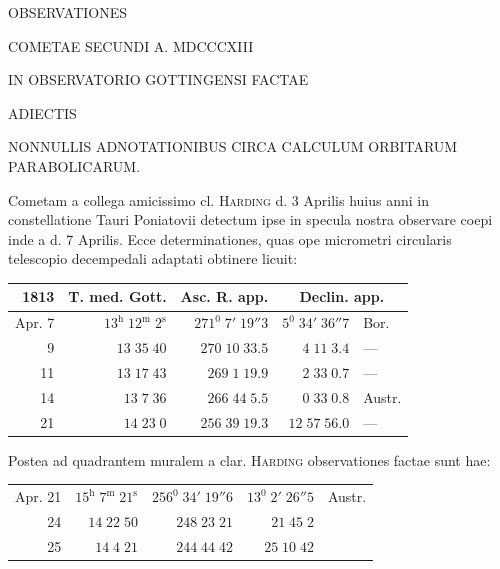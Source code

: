 \renewcommand{\Article}[1]{\par\medskip\Needspace{4\baselineskip}\pdfbookmark[1]{Art. #1}{cometae-art-#1}\centerline{\textbf{#1.}}\nobreak\smallskip}
\begin{center}
{\large OBSERVATIONES}\par\medskip
{\Large COMETAE SECUNDI A. MDCCCXIII}\par\medskip
IN OBSERVATORIO GOTTINGENSI FACTAE\par\medskip
ADIECTIS\par\medskip
NONNULLIS ADNOTATIONIBUS CIRCA CALCULUM ORBITARUM PARABOLICARUM.
\end{center}

Cometam a collega amicissimo cl. \textsc{Harding} d. 3 Aprilis huius anni in constellatione Tauri Poniatovii detectum ipse in specula nostra observare coepi inde a d. 7 Aprilis. Ecce determinationes, quas ope micrometri circularis telescopio decempedali adaptati obtinere licuit:
\begin{center}\small\setlength{\tabcolsep}{4pt}
\begin{tabular}{r|r|r|r l}
1813&T. med. Gott.&Asc. R. app.&\multicolumn{2}{c}{Declin. app.}\\\hline
Apr. 7&$13^{\mathrm h}\;12^{\mathrm m}\;2^{\mathrm s}$&$271^0\;7'\;19''3$&$5^0\;34'\;36''7$&Bor.\\
9&$13\;35\;40$&$270\;10\;33.5$&$4\;11\;3.4$&—\\
11&$13\;17\;43$&$269\;1\;19.9$&$2\;33\;0.7$&—\\
14&$13\;7\;36$&$266\;44\;5.5$&$0\;33\;0.8$&Austr.\\
21&$14\;23\;0$&$256\;39\;19.3$&$12\;57\;56.0$&—
\end{tabular}\end{center}

Postea ad quadrantem muralem a clar. \textsc{Harding} observationes factae sunt hae:
\begin{center}\small\setlength{\tabcolsep}{4pt}
\begin{tabular}{r|r|r|r l}
Apr. 21&$15^{\mathrm h}\;7^{\mathrm m}\;21^{\mathrm s}$&$256^0\;34'\;19''6$&$13^0\;2'\;26''5$&Austr.\\
24&$14\;22\;50$&$248\;23\;21$&$21\;45\;2$&\\
25&$14\;4\;21$&$244\;44\;42$&$25\;10\;42$&
\end{tabular}\end{center}

